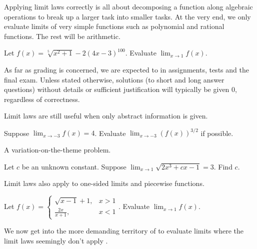 \documentclass[../main.tex]{subfiles}
\begin{document}
\clearpage

Applying limit laws correctly is all about decomposing a function along algebraic operations to break up a larger task into smaller tasks. At the very end, we only evaluate limits of very simple functions such as polynomial and rational functions. The rest will be arithmetic.
\begin{example}
  Let \(f(x) = \sqrt[5]{x^{2} + 1} - 2 (4x - 3)^{100}\). Evaluate \(\lim_{x \to 1} f(x)\).

\end{example}

\faExclamationTriangle{} As far as grading is concerned, we are expected to  in assignments, tests and the final exam.  Unless stated otherwise, solutions (to short and long answer questions) without details or sufficient justification will typically be given \(0\), regardless of correctness. 
\clearpage

Limit laws are still useful when only abstract information is given.
\begin{example}
  Suppose \(\lim_{x \to -3} f(x) = 4\). Evaluate \(\lim_{x \to -3} \left( f(x) \right)^{3/2}\) if possible.

\end{example}

A variation-on-the-theme problem.  
\begin{example}
  Let \(c\) be an unknown constant. Suppose \(\lim_{x \to 1} \sqrt{2x^{3} + cx - 1} = 3\). Find \(c\).

\end{example}

\faLightbulb{} Limit laws also apply to one-sided limits and piecewise functions.
\begin{example}
  Let \(f(x) = \begin{cases}\sqrt{x - 1} + 1, &x > 1\\[1ex]\frac{2x}{x + 1}, &x < 1\end{cases}\). Evaluate \(\lim_{x \to 1} f(x)\).

\end{example}

We now get into the more demanding territory of  to evaluate limits where the limit laws seemingly don't apply .
\end{document}
